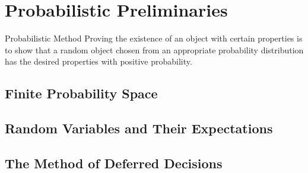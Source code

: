 \section{Probabilistic Preliminaries}
\begin{df}{Probabilistic Method}
	Proving the existence of an object with certain properties is to show that a random object chosen from an appropriate probability distribution has the desired properties with positive probability. 	
\end{df}

\subsection{Finite Probability Space}
\subsection{Random Variables and Their Expectations}
\subsection{The Method of Deferred Decisions}